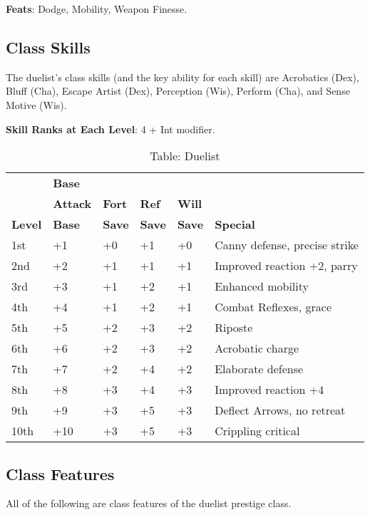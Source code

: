 \textbf{Feats}: Dodge, Mobility, Weapon Finesse.
				
\subsection{Class Skills}

				
The duelist's class skills (and the key ability for each skill) are Acrobatics (Dex), Bluff (Cha), Escape Artist (Dex), Perception (Wis), Perform (Cha), and Sense Motive (Wis).
				
\textbf{ Skill Ranks at Each Level}: 4 + Int modifier.


\begin{table*}[]  %
\sffamily
\caption{Table: Duelist}
\begin{tabular}{llllll}
               &\textbf{Base} \\
               &\textbf{Attack} & \textbf{Fort} & \textbf{Ref}  & \textbf{Will}\\
\textbf{Level} &\textbf{Base}   & \textbf{Save} & \textbf{Save} & \textbf{Save} & \textbf{Special}\\
1st & +1 & +0 & +1 & +0 & Canny defense, precise strike\\
2nd & +2 & +1 & +1 & +1 & Improved reaction +2, parry\\
3rd & +3 & +1 & +2 & +1 & Enhanced mobility\\
4th & +4 & +1 & +2 & +1 & Combat Reflexes, grace\\
5th & +5 & +2 & +3 & +2 & Riposte\\
6th & +6 & +2 & +3 & +2 & Acrobatic charge\\
7th & +7 & +2 & +4 & +2 & Elaborate defense\\
8th & +8 & +3 & +4 & +3 & Improved reaction +4\\
9th & +9 & +3 & +5 & +3 & Deflect Arrows, no retreat\\
10th & +10 & +3 & +5 & +3 & Crippling critical\\
\end{tabular}
\end{table*}
				
\subsection{Class Features}

				
All of the following are class features of the duelist prestige class.
				
